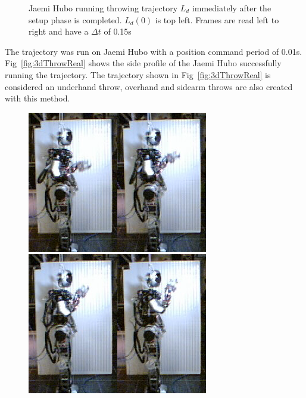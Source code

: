 \begin{figure}[thpb]
  \caption{Jaemi Hubo running throwing trajectory $L_d$ immediately after the setup phase is completed.  $L_d(0)$ is top left.  Frames are read left to right and have a $\Delta t$ of 0.15s}
  \label{fig:fThrow}
\end{figure}



The trajectory was run on Jaemi Hubo with a position command period of 0.01s.  Fig~\ref{fig:3dThrowReal} shows the side profile of the Jaemi Hubo successfully running the trajectory.  The trajectory shown in Fig~\ref{fig:3dThrowReal} is considered an underhand throw, overhand and sidearm throws are also created with this method.

\begin{figure}[thpb]
  \centering
\includegraphics[width=0.25\columnwidth]{./pictures/slowMotion/1.png}\includegraphics[width=0.25\columnwidth]{./pictures/slowMotion/2.png}\includegraphics[width=0.25\columnwidth]{./pictures/slowMotion/3.png}\includegraphics[width=0.25\columnwidth]{./pictures/slowMotion/4.png}

\end{figure}
